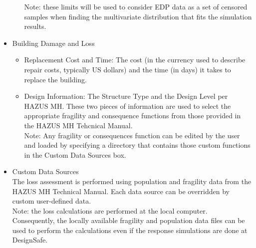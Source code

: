 \begin{itemize}
\begin{itemize}
        Note: these limits will be used to consider EDP data as a set of censored samples when finding the multivariate distribution that fits the simulation results.
    \end{itemize}
    \item Building Damage and Loss
    \begin{itemize}
        \item Replacement Cost and Time: The cost (in the currency used to describe repair costs, typically US dollars) and the time (in days) it takes to replace the building.
        \item Design Information: The Structure Type and the Design Level per HAZUS MH. These two pieces of information are used to select the appropriate fragility and consequence functions from those provided in the HAZUS MH Tehcnical Manual.\\
        Note: Any fragility or consequences function can be edited by the user and loaded by specifying a directory that contains those custom functions in the Custom Data Sources box.
    \end{itemize}
    \item Custom Data Sources\\
    The loss assessment is performed using population and fragility data from the HAZUS MH Technical Manual. Each data source can be overridden by custom user-defined data.\\
    Note: the loss calculations are performed at the local computer. Consequently, the locally available fragility and population data files can be used to perform the calculations even if the response simulations are done at DesignSafe.
\end{itemize} 